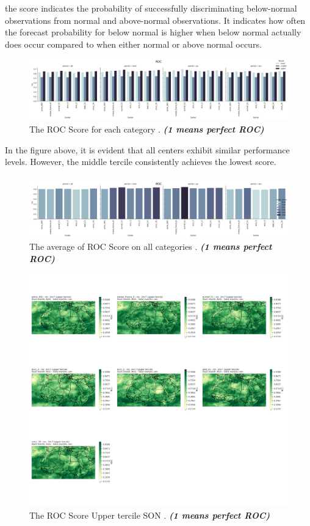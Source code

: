 the score indicates the probability of successfully
discriminating below-normal observations from normal and above-normal observations. It
indicates how often the forecast probability for below normal is higher when below normal
actually does occur compared to when either normal or above normal occurs.


\begin{figure}[H]
    \centering
    \includegraphics[scale=0.3]{roc.png}
    \caption{The ROC Score for each category  . \textbf{\textit{(1 means perfect ROC)}}}
\end{figure}

In the figure above, it is evident that all centers exhibit similar performance levels. However, the middle tercile consistently achieves the lowest score.
\begin{figure}[H]
    \centering
    \includegraphics[scale=0.3]{roc_all.png}
    \caption{The average of  ROC Score on all categories    . \textbf{\textit{(1 means perfect ROC)}}}
\end{figure}


\begin{figure}[H]
    \centering
    \includegraphics[scale=0.3]{ROC_UPPER_SON.png}
    \caption{The ROC Score Upper tercile SON    . \textbf{\textit{(1 means perfect ROC)}}}
\end{figure}



